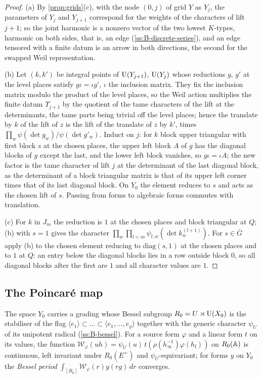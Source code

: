 \begin{proof}
(a) By \cref{prop:grids}(c), with the node $(0,j)$ of grid $Y$ as $Y_j$, the parameters of $Y_j$ and $Y_{j+1}$ correspond for the weights of the characters of lift $j+1$; so the joint harmonic is a nonzero vector of the two lowest $K$-types, harmonic on both sides, that is, an edge (\cref{ss:B-discrete-series}), and an edge tensored with a finite datum
is an arrow in both directions, the second for the swapped Weil representation.

(b) Let $(k,k')$ be integral points of $\operatorname{U}(Y_{j+1})$, $\operatorname{U}(Y_j)$ whose reductions $g$, $g'$ at the level places satisfy $g\iota=\iota g'$, $\iota$ the inclusion matrix. They fix the inclusion matrix modulo the product of the level places, so the Weil action multiplies the finite datum $\Upsilon_{j+1}$ by the quotient of the tame characters of the lift at
the determinants, the tame parts being trivial off the level places; hence the translate by $k$ of the lift of $z$ is the lift of the translate of $z$ by $k'$, times $\prod_w\psi(\det g_w)/\psi(\det g'_w)$. Induct on $j$: for $k$ block upper triangular with first block $s$ at the chosen places, the upper left block $A$ of $g$ has the
diagonal blocks of $g$ except the last, and the lower left block vanishes, so $g\iota=\iota A$; the new factor is the tame character of lift $j$ at the determinant of the last diagonal block, as the determinant of a block triangular matrix is that of its upper left corner times that of its last diagonal block. On $Y_0$ the element reduces to $s$
and acts as the chosen lift of $s$. Passing from forms to algebraic forms commutes with translation.

(c) For $k$ in $J_m$ the reduction is $1$ at the chosen places and block triangular at $Q$; (b) with $s=1$ gives the character $\prod_w\prod_{l<m}\psi_{l,w}(\det k_w^{(l+1)})$. For $s\in\bar G$ apply (b) to the chosen element reducing to $\mathrm{diag}(s,1)$ at the chosen places and to $1$ at $Q$: an entry below the diagonal blocks lies in a row
outside block $0$, so all diagonal blocks after the first are $1$ and all character values are $1$.
\end{proof}

\subsection{The Poincar\'e map}\label{ss:poincare}
The space $Y_0$ carries a grading whose Bessel subgroup $R_0=U\rtimes\operatorname{U}(X_0)$ is the stabiliser of the flag
$\langle e_1\rangle\subset\dots\subset\langle e_1,\dots,e_\varrho\rangle$ together with the generic character $\psi_U$ of its
unipotent radical (\cref{ss:B-bessel}). For a source form $\varphi$ and a linear form $t$ on its values, the function
$\mathcal W_\varphi(uh)=\psi_U(u)\,t(\rho(h_\infty^{-1})\varphi(h_{\mathrm f}))$ on $R_0(\mathbb{A})$ is continuous, left invariant under
$R_0(E^+)$ and $\psi_U$-equivariant; for forms $y$ on $Y_0$ the \emph{Bessel period}
$\int_{[R_0]}\mathcal W_\varphi(r)\overline{y(rg)}\,dr$ converges.


